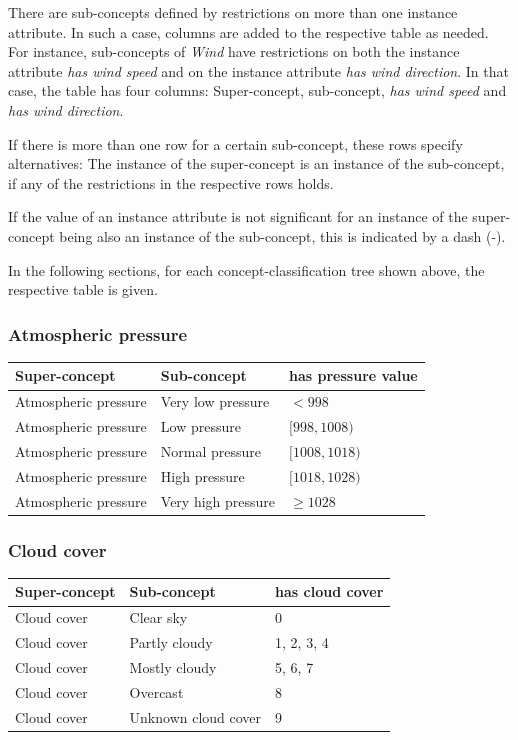 There are sub-concepts defined by restrictions on more than one instance attribute. In such a case, columns are added to the respective table as needed. For instance, sub-concepts of \emph{Wind} have restrictions on both the instance attribute \emph{has wind speed} and on the instance attribute \emph{has wind direction}. In that case, the table has four columns: Super-concept, sub-concept, \emph{has wind speed} and \emph{has wind direction}.

If there is more than one row for a certain sub-concept, these rows specify alternatives: The instance of the super-concept is an instance of the sub-concept, if any of the restrictions in the respective rows holds.

If the value of an instance attribute is not significant for an instance of the super-concept being also an instance of the sub-concept, this is indicated by a dash (-).

In the following sections, for each concept-classification tree shown above, the respective table is given.

\subsubsection{Atmospheric pressure}

\begin{longtable}{|p{}|p{}|p{}|}
  \hline
  \textbf{Super-concept} & \textbf{Sub-concept} & \textbf{has pressure value} \\
  \hline\hline
  Atmospheric pressure & Very low pressure & $< 998$ \\
  \hline
  Atmospheric pressure & Low pressure & $[998, 1008)$ \\
  \hline
  Atmospheric pressure & Normal pressure & $[1008, 1018)$ \\
  \hline
  Atmospheric pressure & High pressure & $[1018, 1028)$ \\
  \hline
  Atmospheric pressure & Very high pressure & $\geq 1028$ \\
  \hline
\end{longtable}

\subsubsection{Cloud cover}

\begin{longtable}{|p{}|p{}|p{}|}
  \hline
  \textbf{Super-concept} & \textbf{Sub-concept} & \textbf{has cloud cover} \\
  \hline\hline
  Cloud cover & Clear sky & 0 \\
  \hline
  Cloud cover & Partly cloudy & 1, 2, 3, 4 \\
  \hline
  Cloud cover & Mostly cloudy & 5, 6, 7 \\
  \hline
  Cloud cover & Overcast & 8 \\
  \hline
  Cloud cover & Unknown cloud cover & 9 \\
  \hline
\end{longtable}

